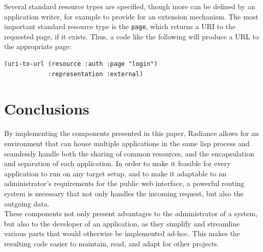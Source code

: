 \documentclass{sig-alternate}
\begin{document}
Several standard resource types are specified, though more can be defined by an application writer, for example to provide for an extension mechanism. The most important standard resource type is the \texttt{page}, which returns a URI to the requested page, if it exists. Thus, a code like the following will produce a URL to the appropriate page:

\begin{verbatim}
(uri-to-url (resource :auth :page "login")
            :representation :external)
\end{verbatim}

\section{Conclusions}
By implementing the components presented in this paper, Radiance allows for an environment that can house multiple applications in the same lisp process and seamlessly handle both the sharing of common resources, and the encapsulation and separation of each application. In order to make it feasible for every application to run on any target setup, and to make it adaptable to an administrator's requirements for the public web interface, a powerful routing system is necessary that not only handles the incoming request, but also the outgoing data. \\

These components not only present advantages to the administrator of a system, but also to the developer of an application, as they simplify and streamline various parts that would otherwise be implemented ad-hoc. This makes the resulting code easier to maintain, read, and adapt for other projects.


\end{document}
